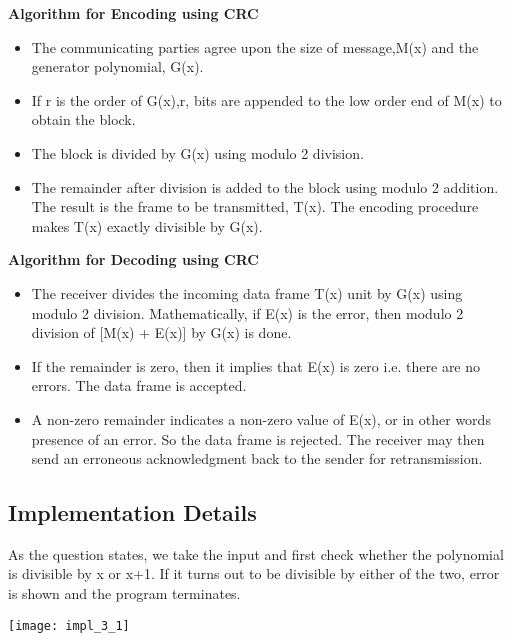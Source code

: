 \documentclass[11pt,a4paper]{article}
\begin{document}
\textbf{Algorithm for Encoding using CRC}

\begin{itemize}

\item The communicating parties agree upon the size of message,M(x) and the generator polynomial, G(x).

\item If r is the order of G(x),r, bits are appended to the low order end of M(x) to obtain the block.

\item The block is divided by G(x) using modulo 2 division.

\item The remainder after division is added to the block using modulo 2 addition. The result is the frame to be transmitted, T(x). The encoding procedure makes T(x) exactly divisible by G(x).

\end{itemize}

\textbf{Algorithm for Decoding using CRC}

\begin{itemize}

\item The receiver divides the incoming data frame T(x) unit by G(x) using modulo 2 division. Mathematically, if E(x) is the error, then modulo 2 division of [M(x) + E(x)] by G(x) is done.

\item If the remainder is zero, then it implies that E(x) is zero i.e. there are no errors. The data frame is accepted.

\item A non-zero remainder indicates a non-zero value of E(x), or in other words presence of an error. So the data frame is rejected. The receiver may then send an erroneous acknowledgment back to the sender for retransmission.

\end{itemize}

\subsection{Implementation Details}\label{sec:details3}
As the question states, we take the input and first check whether the polynomial is divisible by x or x+1.
If it turns out to be divisible by either of the two, error is shown and the program terminates.

\texttt{[image: impl\_3\_1]}
\end{document}
